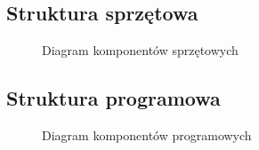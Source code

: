 \documentclass[a4paper,twoside,11pt]{article}
\begin{document}
\subsection{Struktura sprzętowa}
	\begin{figure}[H]
		\begin{center}
           	\end{center}
           	\caption{Diagram komponentów sprzętowych}
	\end{figure}

\subsection{Struktura programowa}
	\begin{figure}[H]
		\begin{center}
           	\end{center}
           	\caption{Diagram komponentów programowych}
	\end{figure}
\end{document}
